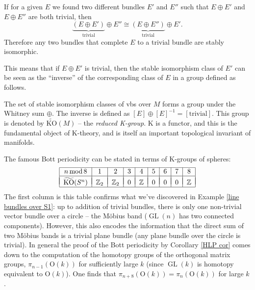 \documentclass[english,letterpaper]{article}%
\numberwithin{equation}{section}
\numberwithin{figure}{section}
\numberwithin{table}{section}
\theoremstyle{definition}
\theoremstyle{definition}
\theoremstyle{definition}
\theoremstyle{plain}
\theoremstyle{plain}
\theoremstyle{plain}
\theoremstyle{plain}
\theoremstyle{remark}
\theoremstyle{remark}
\DeclareMathOperator{\GL}{GL}
\begin{document}
\begin{cor}
If for a given $E$ we found two different bundles $E'$ and $E''$ such that $E\oplus E'$ and $E\oplus E''$ are both trivial, then 
\[
\underbrace{(E\oplus E')}_{\text{trivial}}\oplus E''\cong \underbrace{(E\oplus E'')}_{\text{trivial}}\oplus E'.\]
Therefore any two bundles that complete $E$ to a trivial bundle are stably isomorphic.
\end{cor}

This means that if $E\oplus E'$ is trivial, then the stable isomorphism class of $E'$ can be seen as the ``inverse'' of the corresponding class of $E$ in a group defined as follows.

\begin{defn}[K-groups]
The set of stable isomorphism classes of \glspl{vb} over $M$ forms a group under the Whitney sum $\oplus$.
The inverse is defined as $[E]\oplus [E]^{-1}=[\text{trivial}]$. This group is denoted by $\widetilde{\mathrm{KO}}(M)$ -- the \emph{reduced K-group}. K is a functor, and this is the fundamental object of K-theory, and is itself an important topological invariant of manifolds.
\end{defn}

\begin{example}
The famous Bott periodicity can be stated in terms of K-groups of spheres:
\[\begin{tabular}{|c|c|c|c|c|c|c|c|c|}
\hline 
$n\,\mathrm{mod}\,8$ & 1 & 2 & 3 & 4 & 5 & 6 & 7 & 8\tabularnewline
\hline &&&&&&&&\\[-1em]
$\widetilde{\mathrm{KO}}(S^{n})$ & $\mathbb{Z}_{2}$ & $\mathbb{Z}_{2}$ & $0$ & $\mathbb{Z}$ & $0$ & $0$ & $0$ & $\mathbb{Z}$\tabularnewline
\hline 
\end{tabular}\]
The first column is this table confirms what we've discovered in Example \ref{line bundles over S1}: up to addition of trivial bundles, there is only one non-trivial vector bundle over a circle -- the M\"obius band ($\GL(n)$ has two connected components). However, this also encodes the information that the direct sum of two M\"obius bands is a trivial plane bundle (any plane bundle over the circle is trivial). In general the proof of the Bott periodicity by Corollary \ref{HLP cor} comes down to the computation of the homotopy groups of the orthogonal matrix groups, $\pi_{n-1}(\mathrm{O}(k))$ for sufficiently large $k$ (since $\GL(k)$ is homotopy equivalent to $\mathrm{O}(k)$). One finds that $\pi_{n+8}(\mathrm{O}(k))=\pi_n(\mathrm{O}(k))$ for large $k$.
\end{example}
\end{document}
